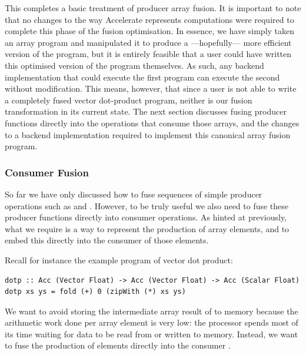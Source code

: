 This completes a basic treatment of producer array fusion. It is important to
note that no changes to the way Accelerate represents computations were required
to complete this phase of the fusion optimisation. In essence, we have simply
taken an array program and manipulated it to produce a ---hopefully--- more
efficient version of the program, but it is entirely feasible that a user could
have written this optimised version of the program themselves. As such, any
backend implementation that could execute the first program can execute the
second without modification.
%
This means, however, that since a user is not able to write a completely fused
vector dot-product program, neither is our fusion transformation in its current
state. The next section discusses fusing producer functions directly into the
operations that consume those arrays, and the changes to a backend
implementation required to implement this canonical array fusion program.


\subsubsection{Consumer Fusion}

So far we have only discussed how to fuse sequences of simple producer
operations such as  and . However, to be truly
useful we also need to fuse these producer functions directly into consumer
operations. As hinted at previously, what we require is a way to represent the
production of array elements, and to embed this directly into the consumer of
those elements. %

Recall for instance the example program of vector dot product:
%
\begin{lstlisting}[style=haskell]
dotp :: Acc (Vector Float) -> Acc (Vector Float) -> Acc (Scalar Float)
dotp xs ys = fold (+) 0 (zipWith (*) xs ys)
\end{lstlisting}
%
We want to avoid storing the intermediate array result of
 to memory because the arithmetic work done per array
element is very low: the processor spends most of its time waiting for data to
be read from or written to memory. Instead, we want to fuse the production of
elements directly into the consumer .

